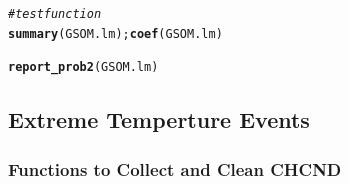 \documentclass{article}\usepackage[]{graphicx}\usepackage[]{color}
\makeatletter
\newcommand{\hlcom}[1]{\textcolor[rgb]{0.678,0.584,0.686}{\textit{#1}}}%
\newcommand{\hlstd}[1]{\textcolor[rgb]{0.345,0.345,0.345}{#1}}%
\newcommand{\hlkwd}[1]{\textcolor[rgb]{0.737,0.353,0.396}{\textbf{#1}}}%
\newenvironment{kframe}{%
 \def\at@end@of@kframe{}%
 \ifinner\ifhmode%
  \def\at@end@of@kframe{\end{minipage}}%
  \begin{minipage}{\columnwidth}%
 \fi\fi%
 \def\FrameCommand##1{\hskip\@totalleftmargin \hskip-\fboxsep
 \colorbox{shadecolor}{##1}\hskip-\fboxsep
     \hskip-\linewidth \hskip-\@totalleftmargin \hskip\columnwidth}%
 \MakeFramed {\advance\hsize-\width
   \@totalleftmargin\z@ \linewidth\hsize
   \@setminipage}}%
 {\par\unskip\endMakeFramed%
 \at@end@of@kframe}
\newenvironment{knitrout}{}{} %
\makeatother
\begin{document}
\begin{knitrout}
\begin{kframe}
\begin{alltt}
\hlcom{#test function}
\hlkwd{summary}\hlstd{(GSOM.lm);} \hlkwd{coef}\hlstd{(GSOM.lm)}
\end{alltt}


{\ttfamily\noindent\bfseries\color{errorcolor}{\#\# Error in summary(GSOM.lm): object 'GSOM.lm' not found}}

{\ttfamily\noindent\bfseries\color{errorcolor}{\#\# Error in coef(GSOM.lm): object 'GSOM.lm' not found}}\begin{alltt}
\hlkwd{report_prob2}\hlstd{(GSOM.lm)}
\end{alltt}


{\ttfamily\noindent\bfseries\color{errorcolor}{\#\# Error in anova(lm): object 'GSOM.lm' not found}}\end{kframe}
\end{knitrout}

\subsection{Extreme Temperture Events}

\subsubsection{Functions to Collect and Clean CHCND}
\end{document}
